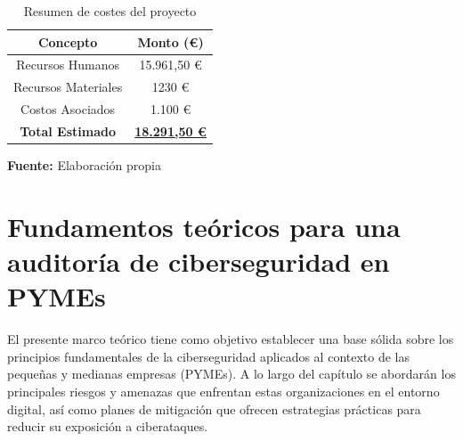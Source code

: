 \documentclass[a4paper, 10pt]{article}
\begin{document}
\begin{table}[H]
\caption{Resumen de costes del proyecto}
\centering
\renewcommand{\arraystretch}{1.5}
\begin{tabular}{|c|c|}
\hline
\textbf{Concepto} & \textbf{Monto (€)} \\ \hline
Recursos Humanos & 15.961,50 € \\ \hline
Recursos Materiales & 1230 € \\ \hline
Costos Asociados & 1.100 € \\ \hline
\textbf{Total Estimado} & \underline{\textbf{18.291,50 €}} \\ \hline
\end{tabular}
\begin{flushleft}\centering
    \footnotesize \textbf{Fuente:} Elaboración propia
\end{flushleft}   
\label{tab:resumen_costes}
\end{table}



\clearpage































\par\vspace{0.5cm}

\section{Fundamentos teóricos para una auditoría de ciberseguridad en PYMEs}
\par\vspace{0.5cm}


El presente marco teórico tiene como objetivo establecer una base sólida sobre los principios fundamentales de la ciberseguridad aplicados al contexto de las pequeñas y medianas empresas (PYMEs). A lo largo del capítulo se abordarán los principales riesgos y amenazas que enfrentan estas organizaciones en el entorno digital, así como planes de mitigación que ofrecen estrategias prácticas para reducir su exposición a ciberataques.
\end{document}
